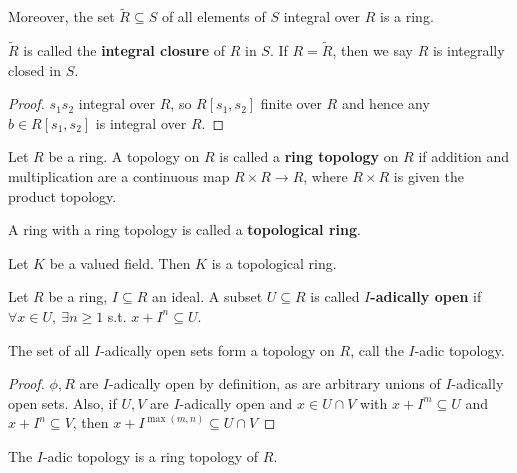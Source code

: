 \documentclass[a4paper]{article}
\begin{document}
{\begin{cor-num}
	Moreover, the set $\widetilde{R}\subseteq S$ of all elements of $S$ integral over $R$ is a ring.
\end{cor-num}
\begin{defi}
	$\widetilde{R}$ is called the \textbf{integral closure} of $R$ in $S$. If $R=\widetilde{R}$, then we say $R$ is integrally closed in $S$.
\end{defi}
\begin{proof}
	$s_1s_2$ integral over $R$, so $R[s_1,s_2]$ finite over $R$ and hence any $b\in R[s_1, s_2]$ is integral over $R$.
\end{proof}

\begin{defi-num}
	Let $R$ be a ring. A topology on $R$ is called a \textbf{ring topology} on $R$ if addition and multiplication are a continuous map $R\times R\to R$, where $R\times R$ is given the product topology.
	
	A ring with a ring topology is called a \textbf{topological ring}.
\end{defi-num}

\begin{exer}
	Let $K$ be a valued field. Then $K$ is a topological ring.
\end{exer}

\begin{defi-num}
	Let $R$ be a ring, $I\subseteq R$ an ideal. A subset $U\subseteq R$ is called \textbf{$I$-adically open} if $\forall x\in U,\ \exists n\geq 1$ s.t. $x+I^n \subseteq U$.
\end{defi-num}

\begin{prop-num}
	The set of all $I$-adically open sets form a topology on $R$, call the $I$-adic topology.
\end{prop-num}
\begin{proof}
	$\phi, R$ are $I$-adically open by definition, as are arbitrary unions of $I$-adically open sets. Also, if $U,V$ are $I$-adically open and $x\in U\cap V$ with $x+I^m\subseteq U$ and $x+I^n\subseteq V$, then $x+I^{\max(m,n)}\subseteq U\cap V$
\end{proof}

\begin{exer}
	The $I$-adic topology is a ring topology of $R$.
\end{exer}

}
\end{document}
